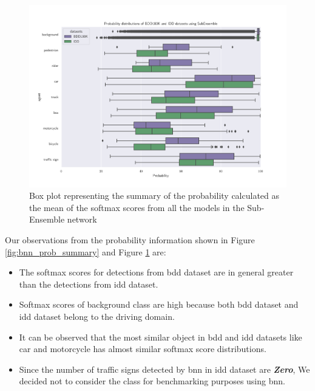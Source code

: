     \begin{figure}[H]
        \centering
        \includegraphics[scale=0.6]{images/distributions/SubEns_bdd_vs_iid_probabilities.png}
        \caption[Box plot of probability with Sub-Ensemble model]{Box plot representing the summary of the probability calculated as the mean of the softmax scores from all the models in the Sub-Ensemble network}
        \label{fig:subens_prob_summary}
    \end{figure}
    
    Our observations from the probability information shown in Figure \ref{fig:bnn_prob_summary} and Figure \ref{fig:subens_prob_summary} are:
    \begin{itemize}
        \item The softmax scores for detections from \acrshort{bdd} dataset are in general greater than the detections from \acrshort{idd} dataset.
        \item Softmax scores of background class are high because both \acrshort{bdd} dataset and \acrshort{idd} dataset belong to the driving domain.
        \item It can be observed that the most similar object in \acrshort{bdd} and \acrshort{idd} datasets like car and motorcycle has almost similar softmax score distributions.
        \item Since the number of traffic signs detected by \acrshort{bnn} in \acrshort{idd} dataset are \textbf{\textit{Zero}}, We decided not to consider the class for benchmarking purposes using \acrshort{bnn}.
        
    \end{itemize}
    
